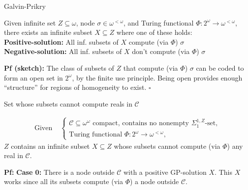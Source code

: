 \begin{frame}{Galvin-Prikry}
  \begin{fact*}
    Given infinite set $Z\subseteq\omega$, node $\sigma\in\omega^{<\omega}$,
    and Turing functional $\Phi:2^\omega\rightarrow \omega^{<\omega}$,
    there exists an infinite subset $X\subseteq Z$ where one of these
    holds:\\

    \pause
    \vspace{1em}
    \textbf{Positive-solution:} All inf. subsets of $X$ compute (via
    $\Phi$) $\sigma$ \\
    \textbf{Negative-solution:} All inf. subsets of $X$ don't compute (via
    $\Phi$) $\sigma$
  \end{fact*}

  \pause
  \vspace{1em}
  \textbf{Pf (sketch):} The class of subsets of $Z$ that compute (via
  $\Phi$) $\sigma$ can be coded to form an open set in $2^\omega$, by the
  finite use principle. Being open provides enough ``structure'' for
  regions of homogeneity to exist. $\square$
\end{frame}

\begin{frame}{Set whose subsets cannot compute reals in $\mathcal{C}$}
  \begin{main-lemma*}
    \begin{align*}
      \text{Given } &\begin{cases}
        \mathcal{C}\subseteq\omega^\omega \text{ compact, contains
        no nonempty } \Sigma^{1,Z}_1\text{-set},\\
        \text{Turing functional } \Phi:2^{\omega}\rightarrow
        \omega^{<\omega},
      \end{cases}
    \end{align*}
    \pause
    $Z$ contains an infinite subset $X\subseteq Z$ whose subsets cannot
    compute (via $\Phi$) any real in $\mathcal{C}$.
  \end{main-lemma*}

  \pause
  \vspace{3em}
  \textbf{Pf:} \textbf{Case 0:} There is a node outside
  $\mathcal{C}$ with a positive GP-solution $X$. This $X$ works since
  all its subsets compute (via $\Phi$) a node outside $\mathcal{C}$.
\end{frame}

